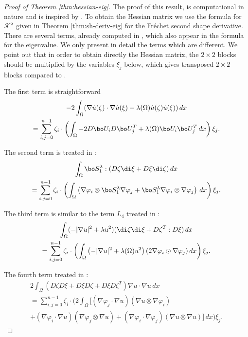 \begin{proof}[Proof of Theorem \ref{thm:hessian-eig}]
The proof of this result, is computational in nature and is inspired by \cite[Prop.\,14]{laurain2ndDeriv}. To obtain the Hessian matrix we use the formula for $\mathcal K^\lambda$ given in Theorem \ref{thm:sh-deriv-eig} for the Fréchet second shape derivative. There are several terms, already computed in \cite[App.\,A]{laurain2ndDeriv}, which also appear in the formula for the eigenvalue. We only present in detail the terms which are different. We point out that in order to obtain directly the Hessian matrix, the $2\times 2$ blocks should be multiplied by the variables $\xi_j$ below, which gives transposed $2\times 2$ blocks compared to \cite{laurain2ndDeriv}.

The first term is straightforward
\vspace*{-5pt}
\begin{multline*}-2 \int_\Omega (\nabla \dot u(\zeta) \cdot \nabla \dot u(\xi) -\lambda(\Omega) \dot u(\zeta) \dot u(\xi))\, dx \\
= \sum_{i,j=0}^{n-1} \zeta_i \cdot \left(\int_\Omega -2D\bo U_i D\bo U_j^T + \lambda(\Omega)\bo U_i \bo U_j^T\, dx\right)\xi_j.
\end{multline*}

The second term is treated in \cite[term $L_3$, p.\,38]{laurain2ndDeriv}:
\vspace*{-5pt}
\begin{multline*} \int_{\Omega} \bo S_1^\lambda :(D\zeta \di \xi+D\xi \di \zeta)\, dx \\
= \sum_{i,j=0}^{n-1} \zeta_i\cdot \left(\int_\Omega \left(\nabla \varphi_i \otimes \bo S_1^\lambda \nabla \varphi_j + \bo S_1^\lambda \nabla \varphi_i \otimes \nabla \varphi_j\right) \, dx\right)\xi_j.
\end{multline*}

The third term is similar to the term $L_4$ treated in \cite[p.\,39]{laurain2ndDeriv}:
\vspace*{-5pt}
\begin{multline*}
\int_\Omega (-|\nabla u|^2+\lambda u^2)(\di \zeta \di \xi+D\zeta^T:D\xi)\, dx\\ =
\sum_{i,j=0}^{n-1} \zeta_i \cdot \left(\int_\Omega \left(-|\nabla u|^2+\lambda(\Omega) u^2\right) (2 \nabla \varphi_i \odot \nabla \varphi_j)\, dx \right) \xi_j.
\end{multline*}

The fourth term treated in \cite[$L_5$ p.\,39]{laurain2ndDeriv}:
\vspace*{-5pt}
\begin{multline*}
2\int_\Omega (D\zeta D\xi +D\xi D\zeta + D\xi D\zeta^T)\nabla u \cdot \nabla u\, dx \\= \sum_{i,j=0}^{n-1} \zeta_i \cdot \bigg(2\int_\Omega\big[ (\nabla \varphi_j\cdot \nabla u)(\nabla u \otimes \nabla \varphi_i)\\ +(\nabla \varphi_i \cdot \nabla u)(\nabla \varphi_j\otimes \nabla u) +(\nabla \varphi_i \cdot \nabla \varphi_j)(\nabla u \otimes \nabla u)\big] \, dx\bigg)\xi_j.
\end{multline*}


\end{proof}
